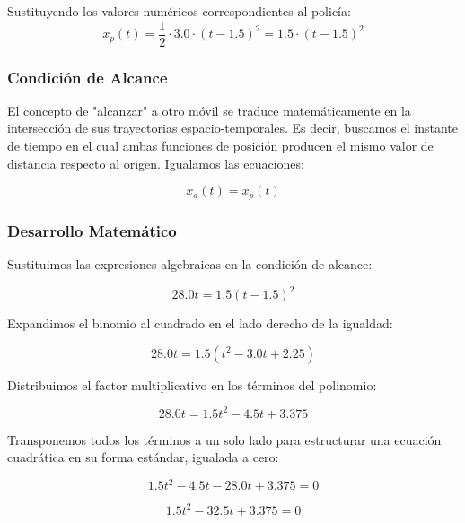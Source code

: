 \documentclass[12pt, a4paper]{article}
\begin{document}
Sustituyendo los valores numéricos correspondientes al policía:
\begin{equation}
x_p(t) = \frac{1}{2} \cdot 3.0 \cdot (t - 1.5)^2 = 1.5 \cdot (t - 1.5)^2
\end{equation}

\subsubsection*{Condición de Alcance}

El concepto de "alcanzar" a otro móvil se traduce matemáticamente en la intersección de sus trayectorias espacio-temporales. Es decir, buscamos el instante de tiempo en el cual ambas funciones de posición producen el mismo valor de distancia respecto al origen. Igualamos las ecuaciones:

\begin{equation}
x_a(t) = x_p(t)
\end{equation}

\subsubsection*{Desarrollo Matemático}

Sustituimos las expresiones algebraicas en la condición de alcance:

\begin{equation}
28.0t = 1.5(t - 1.5)^2
\end{equation}

Expandimos el binomio al cuadrado en el lado derecho de la igualdad:

\begin{equation}
28.0t = 1.5(t^2 - 3.0t + 2.25)
\end{equation}

Distribuimos el factor multiplicativo en los términos del polinomio:

\begin{equation}
28.0t = 1.5t^2 - 4.5t + 3.375
\end{equation}

Transponemos todos los términos a un solo lado para estructurar una ecuación cuadrática en su forma estándar, igualada a cero:

\begin{equation}
1.5t^2 - 4.5t - 28.0t + 3.375 = 0
\end{equation}

\begin{equation}
1.5t^2 - 32.5t + 3.375 = 0
\end{equation}
\end{document}
